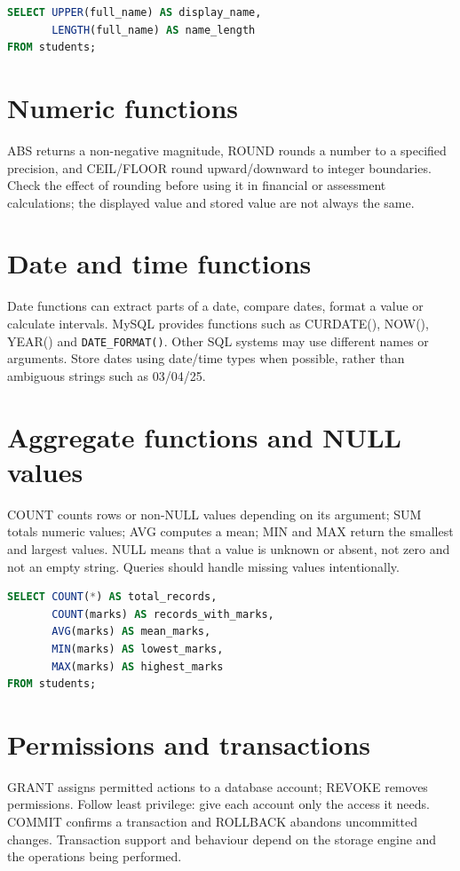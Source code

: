 \documentclass[11pt,openany,oneside]{book}
\begin{document}
\begin{lstlisting}[style=webcode,language=SQL]
SELECT UPPER(full_name) AS display_name,
       LENGTH(full_name) AS name_length
FROM students;
\end{lstlisting}

\section{Numeric functions}
ABS returns a non-negative magnitude, ROUND rounds a number to a specified precision, and CEIL/FLOOR round upward/downward to integer boundaries. Check the effect of rounding before using it in financial or assessment calculations; the displayed value and stored value are not always the same.

\section{Date and time functions}
Date functions can extract parts of a date, compare dates, format a value or calculate intervals. MySQL provides functions such as CURDATE(), NOW(), YEAR() and \texttt{DATE\_FORMAT()}. Other SQL systems may use different names or arguments. Store dates using date/time types when possible, rather than ambiguous strings such as 03/04/25.

\section{Aggregate functions and NULL values}
COUNT counts rows or non-NULL values depending on its argument; SUM totals numeric values; AVG computes a mean; MIN and MAX return the smallest and largest values. NULL means that a value is unknown or absent, not zero and not an empty string. Queries should handle missing values intentionally.

\begin{lstlisting}[style=webcode,language=SQL]
SELECT COUNT(*) AS total_records,
       COUNT(marks) AS records_with_marks,
       AVG(marks) AS mean_marks,
       MIN(marks) AS lowest_marks,
       MAX(marks) AS highest_marks
FROM students;
\end{lstlisting}

\section{Permissions and transactions}
GRANT assigns permitted actions to a database account; REVOKE removes permissions. Follow least privilege: give each account only the access it needs. COMMIT confirms a transaction and ROLLBACK abandons uncommitted changes. Transaction support and behaviour depend on the storage engine and the operations being performed.
\end{document}
